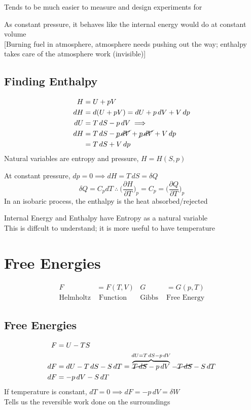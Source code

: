 \documentclass[a4paper, 11pt, normalem]{report}
\newcommand\p{\partial}
\begin{document}
Tends to be much easier to measure and design experiments for

As constant pressure, it behaves like the internal energy would do at constant volume \\
{[}Burning fuel in atmosphere, atmosphere needs pushing out the way; enthalpy takes care of the atmosphere work (invisible){]}

\subsection{Finding Enthalpy}
\begin{align*}
    H &= U + pV \\
    dH &= d(U + pV) = dU + p\,dV + V\,dp \\
    dU &= T\,dS - p\,dV \implies \\
    dH &= T\,dS - \cancel{p\,dV} + \cancel{p\,dV} + V\,dp \\
       &= T\,dS + V\,dp
\end{align*}
Natural variables are entropy and pressure, $H = H(S,p)$

At constant pressure, $dp = 0 \implies dH = T\,dS = \delta Q$
\begin{equation*}
    \delta Q = C_p dT ~\therefore~ \Big(\frac{\p H}{\p T}\Big)_p = C_p = \Big(\frac{\p Q}{\p T}\Big)_p
\end{equation*}
In an isobaric process, the enthalpy is the heat absorbed/rejected

Internal Energy and Enthalpy have Entropy as a natural variable \\
This is diffcult to understand; it is more useful to have temperature

\section{Free Energies}
\begin{align*}
    F &= F(T,V) & G &= G(p, T) \\
    \text{Helmholtz}& \text{ Function} & \text{Gibbs }&\text{Free Energy}
\end{align*}

\subsection{Free Energies}
\begin{align*}
    F &= U - TS \\
    dF &= dU - T\,dS - S\,dT = \overbrace{\cancel{T\,dS} - p\,dV}^{dU = T\,dS - p\,dV} - \cancel{T\,dS} - S\,dT \\
    dF &= -p\,dV - S\,dT
\end{align*}
If temperature is constant, $dT = 0 \implies dF = -p\,dV = \delta W$ \\
Tells us the reversible work done on the surroundings
\end{document}
